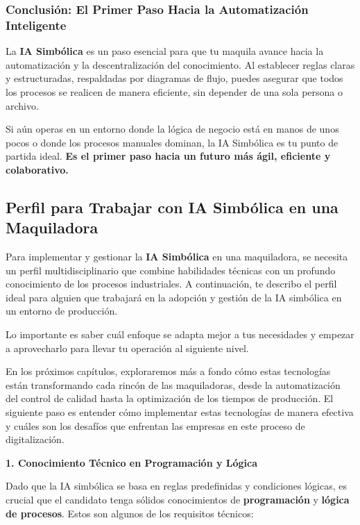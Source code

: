 \documentclass[
  10pt,
  letterpaper,
]{book}
\begin{document}
\subsubsection{Conclusión: El Primer Paso Hacia la Automatización
Inteligente}\label{conclusiuxf3n-el-primer-paso-hacia-la-automatizaciuxf3n-inteligente}

La \textbf{IA Simbólica} es un paso esencial para que tu maquila avance
hacia la automatización y la descentralización del conocimiento. Al
establecer reglas claras y estructuradas, respaldadas por diagramas de
flujo, puedes asegurar que todos los procesos se realicen de manera
eficiente, sin depender de una sola persona o archivo.

Si aún operas en un entorno donde la lógica de negocio está en manos de
unos pocos o donde los procesos manuales dominan, la IA Simbólica es tu
punto de partida ideal. \textbf{Es el primer paso hacia un futuro más
ágil, eficiente y colaborativo.}

\subsection{Perfil para Trabajar con IA Simbólica en una
Maquiladora}\label{perfil-para-trabajar-con-ia-simbuxf3lica-en-una-maquiladora}

Para implementar y gestionar la \textbf{IA Simbólica} en una
maquiladora, se necesita un perfil multidisciplinario que combine
habilidades técnicas con un profundo conocimiento de los procesos
industriales. A continuación, te describo el perfil ideal para alguien
que trabajará en la adopción y gestión de la IA simbólica en un entorno
de producción.

Lo importante es saber cuál enfoque se adapta mejor a tus necesidades y
empezar a aprovecharlo para llevar tu operación al siguiente nivel.

En los próximos capítulos, exploraremos más a fondo cómo estas
tecnologías están transformando cada rincón de las maquiladoras, desde
la automatización del control de calidad hasta la optimización de los
tiempos de producción. El siguiente paso es entender cómo implementar
estas tecnologías de manera efectiva y cuáles son los desafíos que
enfrentan las empresas en este proceso de digitalización.

\textbf{1. Conocimiento Técnico en Programación y Lógica}

Dado que la IA simbólica se basa en reglas predefinidas y condiciones
lógicas, es crucial que el candidato tenga sólidos conocimientos de
\textbf{programación} y \textbf{lógica de procesos}. Estos son algunos
de los requisitos técnicos:
\end{document}
